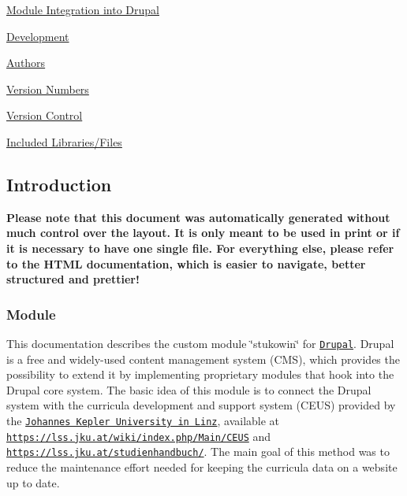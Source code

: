 \begin{DoxyEnumerate}
\begin{DoxyEnumerate}
\begin{DoxyEnumerate}
\end{DoxyEnumerate}
\item \hyperlink{index_Integration}{Module Integration into Drupal}
\end{DoxyEnumerate}
\item \hyperlink{index_Development}{Development}
\begin{DoxyEnumerate}
\item \hyperlink{index_Authors}{Authors}
\item \hyperlink{index_versionnumbers}{Version Numbers}
\item \hyperlink{index_versioncontrol}{Version Control}
\end{DoxyEnumerate}
\item \hyperlink{index_Included}{Included Libraries/\+Files}
\end{DoxyEnumerate}\hypertarget{index_Introduction}{}\subsection{Introduction}\label{index_Introduction}
 \begin{large}\textrm{\textbf{Please note that this document was automatically generated without much control over the layout. It is only meant to be used in print or if it is necessary to have one single file. For everything else, please refer to the HTML documentation, which is easier to navigate, better structured and prettier!}} \end{large} \hypertarget{index_Module_Intro}{}\subsubsection{Module}\label{index_Module_Intro}
This documentation describes the custom module \char`\"{}stukowin\char`\"{} for \href{http://drupal.org/}{\tt Drupal}. Drupal is a free and widely-\/used content management system (C\+M\+S), which provides the possibility to extend it by implementing proprietary modules that hook into the Drupal core system. The basic idea of this module is to connect the Drupal system with the curricula development and support system (C\+E\+U\+S) provided by the \href{http://jku.at}{\tt Johannes Kepler University in Linz}, available at \href{https://lss.jku.at/wiki/index.php/Main/CEUS}{\tt https\+://lss.\+jku.\+at/wiki/index.\+php/\+Main/\+C\+E\+U\+S} and \href{https://lss.jku.at/studienhandbuch/}{\tt https\+://lss.\+jku.\+at/studienhandbuch/}. The main goal of this method was to reduce the maintenance effort needed for keeping the curricula data on a website up to date.

